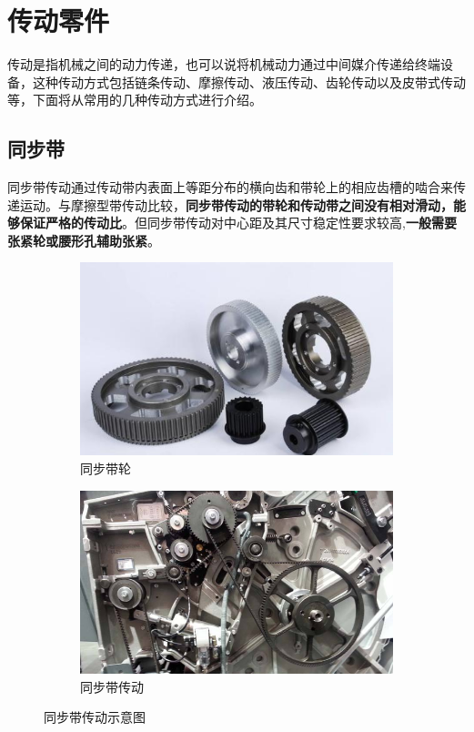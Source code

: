 \documentclass[UTF8]{article} %
\begin{document}
\section{传动零件}
传动是指机械之间的动力传递，也可以说将机械动力通过中间媒介传递给终端设备，这种传动方式包括链条传动、摩擦传动、液压传动、齿轮传动以及皮带式传动等，下面将从常用的几种传动方式进行介绍。

\subsection{同步带}
同步带传动通过传动带内表面上等距分布的横向齿和带轮上的相应齿槽的啮合来传递运动。与摩擦型带传动比较，\textbf{同步带传动的带轮和传动带之间没有相对滑动，能够保证严格的传动比}。但同步带传动对中心距及其尺寸稳定性要求较高,\textbf{一般需要张紧轮或腰形孔辅助张紧}。

\begin{figure}[H]
  \centering
  \begin{subfigure}[b]{0.4\textwidth}
         \centering
         \includegraphics[width=\textwidth]{tb1.png}
          \caption{同步带轮}
  \end{subfigure}
  \quad
  \begin{subfigure}[b]{0.4\textwidth}
          \centering
          \includegraphics[width=\textwidth]{tb2.png}
          \caption{同步带传动}
  \end{subfigure}
  \caption{同步带传动示意图}
\end{figure}
\end{document}
